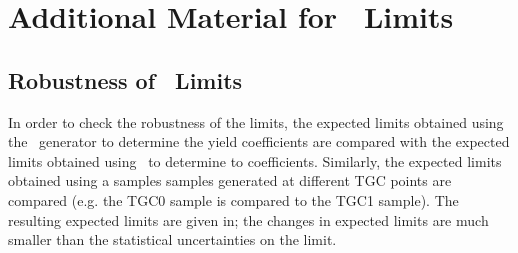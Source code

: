 \clearpage
\appendix
{}

\graphicspath{{Chapters/AppendixTGC/Figures/}}
\chapter{Additional Material for \TGC\ Limits }
\label{appendix:TGC}

\section{Robustness of \TGC\ Limits}
\label{appendix:TGC-Robustness}

In order to check the robustness of the limits, the expected limits obtained
using the \BR\ generator to determine the yield coefficients are compared with
the expected limits obtained using \BHO\ to determine to coefficients.
Similarly, the expected limits obtained using a samples samples generated at
different TGC points are compared (e.g. the TGC0 sample is compared to the TGC1
sample). The resulting expected limits are given in; the changes in expected limits are much smaller
than the statistical uncertainties on the limit.

